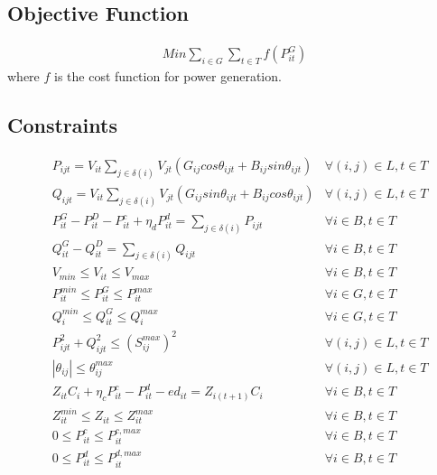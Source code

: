 \subsection*{Objective Function}
\begin{equation}
    \begin{split}
        Min \sum_{i \in G}\sum_{t \in T} f(P_{it}^G)
    \end{split}
    \label{eq:obj}
\end{equation}
where $f$ is the cost function for power generation.

\subsection*{Constraints}
\begin{align}
&P_{ijt} = V_{it} \sum_{j \in \delta(i)} V_{jt}(G_{ij}cos\theta_{ijt}+B_{ij}sin\theta_{ijt})&\forall (i, j) \in L, t \in T\label{eq:Line_balance_P}\\[0.5em]
&Q_{ijt} = V_{it} \sum_{j \in \delta(i)} V_{jt}(G_{ij}sin\theta_{ijt}+B_{ij}cos\theta_{ijt})&\forall (i, j) \in L, t \in T\label{eq:Line_balance_Q}\\[0.5em]
&P_{it}^{G} - P_{it}^D - P_{it}^{c} + \eta_{d}P_{it}^{d} = \sum_{j\in \delta(i)}P_{ijt}&\forall i \in B, t \in T\label{eq:Bus_balance_P}\\[0.5em]
&Q_{it}^{G} - Q_{it}^D = \sum_{j\in \delta(i)}Q_{ijt}&\forall i \in B, t \in T\label{eq:Bus_balance_Q}\\[0.5em]
&V_{min} \leq V_{it} \leq V_{max}& \forall i \in B, t \in T \label{eq:Voltage_limit}\\[0.5em]
&P_{it}^{min} \leq P_{it}^G \leq P_{it}^{max} &\forall i \in G, t \in T \label{eq:Generator_limit_p}\\[0.5em]
&Q_{i}^{min} \leq Q_{it}^G \leq Q_{i}^{max} &\forall i \in G, t \in T \label{eq:Generator_limit_q}\\[0.5em]
& P_{ijt}^2 + Q_{ijt}^2 \leq (S_{ij}^{max})^2 &\forall (i,j) \in L, t \in T\label{eq:Line_limit}\\[0.5em]
&|\theta_{ij}| \leq \theta_{ij}^{max} &\forall (i,j) \in L, t \in T \label{eq:Phase_limit}\\[0.5em]
&Z_{it}C_{i}+\eta_{c}P_{it}^{c}-P_{it}^{d}-ed_{it} = Z_{i(t+1)}C_{i}&\forall i \in B, t \in T\label{eq:charging_balance}\\[0.5em]
&Z_{it}^{min} \leq Z_{it} \leq Z_{it}^{max}&\forall i \in B, t \in T\label{eq:SOC_limit}\\[0.5em]
&0 \leq P_{it}^{c} \leq P_{it}^{c,max} &\forall i \in B, t \in T\label{eq:charging_limit}\\[0.5em]
&0 \leq P_{it}^{d} \leq P_{it}^{d,max} &\forall i \in B, t \in T\label{eq:discharging_limit}
\end{align}


